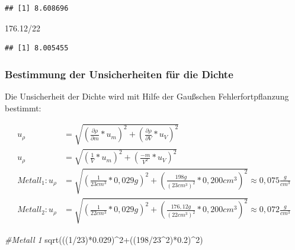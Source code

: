 \documentclass[
  9pt,
]{article}
\newenvironment{Shaded}{\begin{snugshade}}{\end{snugshade}}
\newcommand{\CommentTok}[1]{\textcolor[rgb]{0.56,0.35,0.01}{\textit{#1}}}
\newcommand{\DecValTok}[1]{\textcolor[rgb]{0.00,0.00,0.81}{#1}}
\newcommand{\FloatTok}[1]{\textcolor[rgb]{0.00,0.00,0.81}{#1}}
\newcommand{\FunctionTok}[1]{\textcolor[rgb]{0.00,0.00,0.00}{#1}}
\newcommand{\NormalTok}[1]{#1}
\newcommand{\SpecialCharTok}[1]{\textcolor[rgb]{0.00,0.00,0.00}{#1}}
\begin{document}
\begin{verbatim}
## [1] 8.608696
\end{verbatim}

\begin{Shaded}
\begin{Highlighting}[]
\FloatTok{176.12}\SpecialCharTok{/}\DecValTok{22}
\end{Highlighting}
\end{Shaded}

\begin{verbatim}
## [1] 8.005455
\end{verbatim}

\hypertarget{bestimmung-der-unsicherheiten-fuxfcr-die-dichte}{%
\subsubsection{Bestimmung der Unsicherheiten für die
Dichte}\label{bestimmung-der-unsicherheiten-fuxfcr-die-dichte}}

Die Unsicherheit der Dichte wird mit Hilfe der Gaußschen
Fehlerfortpflanzung bestimmt:

\begin{equation*}
\begin{split}
u_{\rho}&=\sqrt{(\frac{\partial \rho}{\partial m}*u_m)^2+(\frac{\partial \rho}{\partial V}*u_V)^2}\\
u_{\rho}&=\sqrt{(\frac{1}{V}*u_m)^2+(\frac{-m}{V^2}*u_V)^2}\\
Metall_1: u_{\rho}&=\sqrt{(\frac{1}{23cm^3}*0,029g)^2+(\frac{198g}{(23cm^3)^2}*0,200cm^3)^2}\approx 0,075 \frac{g}{cm^3}\\
Metall_2: u_{\rho}&=\sqrt{(\frac{1}{22cm^3}*0,029g)^2+(\frac{176,12g}{(22cm^3)^2}*0,200cm^3)^2}\approx 0,072 \frac{g}{cm^3}
\end{split}
\end{equation*}

\begin{Shaded}
\begin{Highlighting}[]
\CommentTok{\#Metall 1}
\FunctionTok{sqrt}\NormalTok{(((}\DecValTok{1}\SpecialCharTok{/}\DecValTok{23}\NormalTok{)}\SpecialCharTok{*}\FloatTok{0.029}\NormalTok{)}\SpecialCharTok{\^{}}\DecValTok{2}\SpecialCharTok{+}\NormalTok{((}\DecValTok{198}\SpecialCharTok{/}\DecValTok{23}\SpecialCharTok{\^{}}\DecValTok{2}\NormalTok{)}\SpecialCharTok{*}\FloatTok{0.2}\NormalTok{)}\SpecialCharTok{\^{}}\DecValTok{2}\NormalTok{)}
\end{Highlighting}
\end{Shaded}
\end{document}
